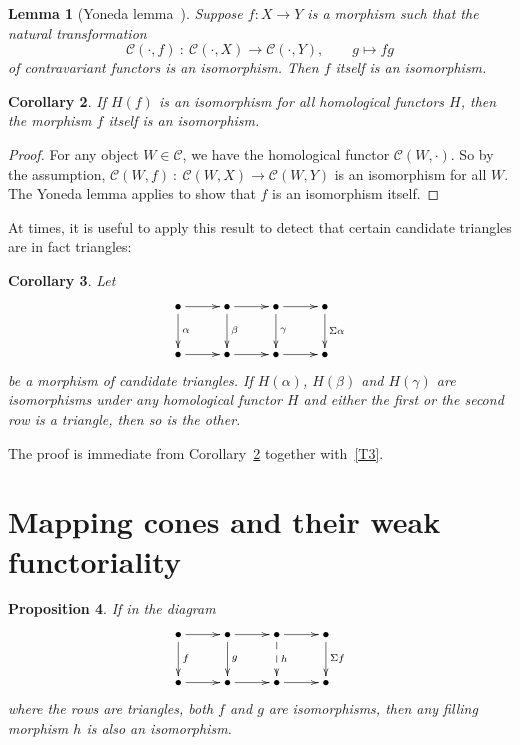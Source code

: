 \documentclass{amsproc}
\newtheorem{prop}{Proposition}[section]
\newtheorem{cor}[prop]{Corollary}
\newtheorem{lem}[prop]{Lemma}
\theoremstyle{definition}
\begin{document}
\begin{lem}[{Yoneda lemma~\cite[III.2]{Mac}}]
\label{yoneda}
Suppose $f:X{\rightarrow} Y$ is a morphism such that the natural transformation
\begin{displaymath}
{\mathcal{C}}(\cdot,f)\: :\: {\mathcal{C}}(\cdot,X){\longrightarrow}{\mathcal{C}}(\cdot,Y),\qquad g\longmapsto fg
\end{displaymath}
of contravariant functors is an isomorphism. Then $f$ itself is an isomorphism.
\end{lem}

\begin{cor}
\label{yonedacor}
If $H(f)$ is an isomorphism for all homological functors $H$, then the morphism $f$ itself is an isomorphism.
\end{cor}

\begin{proof}
For any object $W\in{\mathcal{C}}$, we have the homological functor ${\mathcal{C}}(W,\cdot)$. So by the assumption, ${\mathcal{C}}(W,f)\: :\: {\mathcal{C}}(W,X){\longrightarrow}{\mathcal{C}}(W,Y)$ is an isomorphism for all $W$. The Yoneda lemma applies to show that $f$ is an isomorphism itself.
\end{proof}

At times, it is useful to apply this result to detect that certain candidate triangles are in fact triangles:

\begin{cor}
Let
\[
\xymatrix{ \bullet \ar[r] \ar[d]^\alpha & \bullet \ar[r] \ar[d]^\beta & \bullet \ar[r] \ar[d]^\gamma & \bullet \ar[d]^{\Sigma\alpha} \\
	\bullet \ar[r] & \bullet \ar[r] & \bullet \ar[r] & \bullet }
\]
be a morphism of candidate triangles. If $H(\alpha)$, $H(\beta)$ and $H(\gamma)$ are isomorphisms under any homological functor $H$ and either the first or the second row is a triangle, then so is the other.
\end{cor}

The proof is immediate from Corollary~\ref{yonedacor} together with~\ref{T3}.

\section{Mapping cones and their weak functoriality}
\label{mappingconessection}

\begin{prop}
\label{mappingcone}
If in the diagram
\begin{displaymath}
\xymatrix{{\bullet}\ar[r]\ar[d]^f & {\bullet}\ar[r]\ar[d]^g & {\bullet}\ar[r]\ar@{-->}[d]^h & {\bullet}\ar[d]^{\Sigma f}\\
{\bullet}\ar[r] & {\bullet}\ar[r] & {\bullet}\ar[r] & {\bullet}}
\end{displaymath}
where the rows are triangles, both $f$ and $g$ are isomorphisms, then any filling morphism $h$ is also an isomorphism.
\end{prop}
\end{document}
